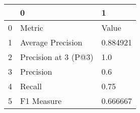 \begin{tabular}{lll}
\toprule
{} &                     0 &         1 \\
\midrule
0 &                Metric &     Value \\
1 &     Average Precision &  0.884921 \\
2 &  Precision at 3 (P@3) &       1.0 \\
3 &             Precision &       0.6 \\
4 &                Recall &      0.75 \\
5 &            F1 Measure &  0.666667 \\
\bottomrule
\end{tabular}
